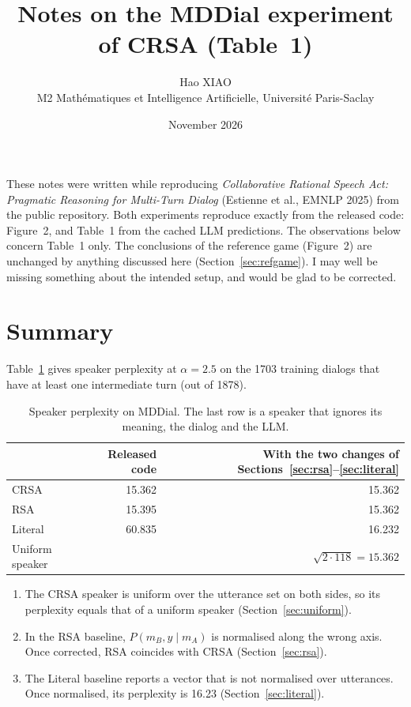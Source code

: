 \documentclass[11pt,a4paper]{article}
\title{\vspace{-1.5em}Notes on the MDDial experiment of CRSA (Table~1)}
\author{Hao XIAO \\ {\small M2 Math\'ematiques et Intelligence Artificielle, Universit\'e Paris-Saclay}}
\date{November 2026}
\begin{document}
\sloppy
\maketitle

These notes were written while reproducing \emph{Collaborative Rational Speech Act: Pragmatic
Reasoning for Multi-Turn Dialog} (Estienne et al., EMNLP 2025) from the public repository.
Both experiments reproduce exactly from the released code: Figure~2, and Table~1 from the cached
LLM predictions. The observations below concern Table~1 only. The conclusions of the reference
game (Figure~2) are unchanged by anything discussed here (Section~\ref{sec:refgame}).
I may well be missing something about the intended setup, and would be glad to be corrected.

\section{Summary}

Table~\ref{tab:main} gives speaker perplexity at $\alpha = 2.5$ on the 1703 training dialogs
that have at least one intermediate turn (out of 1878).

\begin{table}[h]
\centering
\begin{tabular}{lrr}
\toprule
 & Released code & With the two changes of Sections~\ref{sec:rsa}--\ref{sec:literal} \\
\midrule
CRSA & 15.362 & 15.362 \\
RSA & 15.395 & 15.362 \\
Literal & 60.835 & 16.232 \\
\midrule
Uniform speaker & & $\sqrt{2 \cdot 118} = 15.362$ \\
\bottomrule
\end{tabular}
\caption{Speaker perplexity on MDDial. The last row is a speaker that ignores its meaning, the
dialog and the LLM.}
\label{tab:main}
\end{table}

\begin{enumerate}
\item The CRSA speaker is uniform over the utterance set on both sides, so its perplexity equals
that of a uniform speaker (Section~\ref{sec:uniform}).
\item In the RSA baseline, $P(m_B, y \mid m_A)$ is normalised along the wrong axis. Once corrected,
RSA coincides with CRSA (Section~\ref{sec:rsa}).
\item The Literal baseline reports a vector that is not normalised over utterances. Once normalised,
its perplexity is 16.23 (Section~\ref{sec:literal}).
\end{enumerate}
\end{document}
